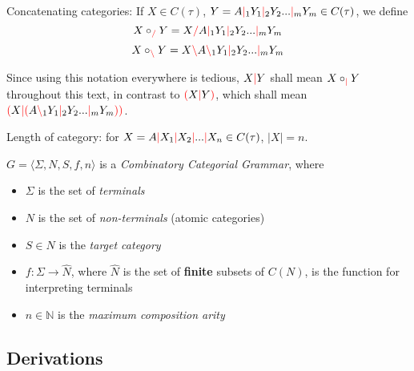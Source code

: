 \documentclass[main.tex]{subfiles}
\begin{document}
\begin{defn}
    Concatenating categories: If $X \in C(\tau)$,
    $Y = A \textcolor{red}{|}_1 Y_1 \textcolor{red}{|}_2 Y_2 ... \textcolor{red}{|}_m Y_m \in C(\tau)$, we define
    \[ X \circ_{\textcolor{red}{/}} Y = X \textcolor{red}{/} A \textcolor{red}{|}_1 Y_1 \textcolor{red}{|}_2 Y_2 ... \textcolor{red}{|}_m Y_m \]
    \[ X \circ_{\textcolor{red}{\backslash}} Y = X \textcolor{red}{\backslash} A \textcolor{red}{\backslash}_1 Y_1 \textcolor{red}{|}_2 Y_2 ... \textcolor{red}{|}_m Y_m \]

    Since using this notation everywhere is tedious, $X \textcolor{red}{|} Y$ shall mean
    $X \circ_{\textcolor{red}{|}} Y$ throughout this text, in contrast to
    $\textcolor{red}{(} X \textcolor{red}{|} Y \textcolor{red}{)}$, which shall mean $\textcolor{red}{(} X \textcolor{red}{|} \textcolor{red}{(} A \textcolor{red}{\backslash}_1 Y_1 \textcolor{red}{|}_2 Y_2 ... \textcolor{red}{|}_m Y_m \textcolor{red}{)} \textcolor{red}{)}$.
\end{defn}

\begin{defn}
    Length of category: for $X = A \textcolor{red}{|} X_1 \textcolor{red}{|} X_2 \textcolor{red}{|} ... \textcolor{red}{|} X_n \in C(\tau)$,
    $|X| = n$.
\end{defn}

\begin{defn}
    $ G = \langle \Sigma, N, S, f, n \rangle $ is a \emph{Combinatory Categorial Grammar}, where
    \begin{itemize}
        \item $ \Sigma $ is the set of \emph{terminals}
        \item $ N $ is the set of \emph{non-terminals} (atomic categories)
        \item $ S \in N $ is the \emph{target category}
        \item $ f : \Sigma \rightarrow \hat{N} $, where $\hat{N}$ is the set of
            \textbf{finite} subsets of $C(N)$, is the function for interpreting
            terminals
        \item $ n \in \mathbb{N} $ is the \emph{maximum composition arity}
    \end{itemize}
\end{defn}

\subsection{Derivations}
\end{document}
